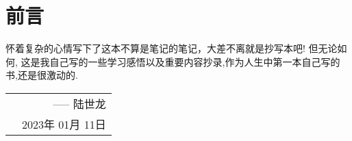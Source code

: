 \thispagestyle{empty}
\chapter*{前言}
怀着复杂的心情写下了这本不算是笔记的笔记，大差不离就是抄写本吧! 但无论如何, 这是我自己写的一些学习感悟以及重要内容抄录,作为人生中第一本自己写的书,还是很激动的.


\hfill 
\begin{tabular}{lr}
    &----- 陆世龙\\ 
&2023年 01月 11日
\end{tabular}

\let\cleardoublepage\clearpage